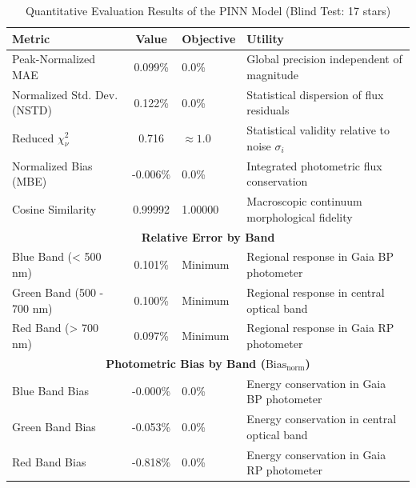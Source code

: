 
\begin{table}[htpb]
\centering
\caption{Quantitative Evaluation Results of the PINN Model (Blind Test: 17 stars)}
\label{tab:pinn_evaluation}
\begin{tabular}{lcll}
\hline
\textbf{Metric} & \textbf{Value} & \textbf{Objective} & \textbf{Utility} \\
\hline
Peak-Normalized MAE & 0.099\% & 0.0\% & Global precision independent of magnitude \\
Normalized Std. Dev. (NSTD) & 0.122\% & 0.0\% & Statistical dispersion of flux residuals \\
Reduced $\chi^2_\nu$ & 0.716 & $\approx 1.0$ & Statistical validity relative to noise $\sigma_i$ \\
Normalized Bias (MBE) & -0.006\% & 0.0\% & Integrated photometric flux conservation \\
Cosine Similarity & 0.99992 & 1.00000 & Macroscopic continuum morphological fidelity \\
\hline
\multicolumn{4}{c}{\textbf{Relative Error by Band}} \\
\hline
Blue Band (< 500 nm) & 0.101\% & Minimum & Regional response in Gaia BP photometer \\
Green Band (500 - 700 nm) & 0.100\% & Minimum & Regional response in central optical band \\
Red Band (> 700 nm) & 0.097\% & Minimum & Regional response in Gaia RP photometer \\
\hline
\multicolumn{4}{c}{\textbf{Photometric Bias by Band ($\text{Bias}_{\text{norm}}$)}} \\
\hline
Blue Band Bias & -0.000\% & 0.0\% & Energy conservation in Gaia BP photometer \\
Green Band Bias & -0.053\% & 0.0\% & Energy conservation in central optical band \\
Red Band Bias & -0.818\% & 0.0\% & Energy conservation in Gaia RP photometer \\
\hline
\end{tabular}
\end{table}
